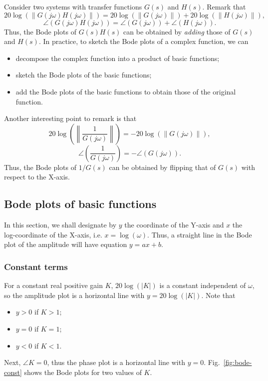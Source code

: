 \documentclass[a4paper,11pt]{report}
\theoremstyle{definition}
\begin{document}
Consider two systems with transfer functions $G(s)$ and $H(s)$. Remark
that
\[
20\log(\|G(j\omega)H(j\omega)\|) = 20\log(\|G(j\omega)\|) + 20 \log(\|H(j\omega)\|),
\]
\[
\angle(G(j\omega)H(j\omega)) = \angle(G(j\omega)) + \angle(H(j\omega)).
\]
Thus, the Bode plots of $G(s)H(s)$ can be obtained by \emph{adding}
those of $G(s)$ and $H(s)$. In practice, to sketch the Bode plots of a
complex function, we can
\begin{itemize}
\item decompose the complex function into a product of basic functions;
\item sketch the Bode plots of the basic functions;
\item add the Bode plots of the basic functions to obtain those of the
  original function.
\end{itemize}

Another interesting point to remark is that
\[
20\log\left(\left\|\frac{1}{G(j\omega)}\right\|\right) = -20\log(\|G(j\omega)\|),
\]
\[
\angle\left(\frac{1}{G(j\omega)}\right) = -\angle(G(j\omega)).
\]
Thus, the Bode plots of $1/G(s)$ can be obtained by flipping that of
$G(s)$ with respect to the X-axis.

\subsection{Bode plots of basic functions}

In this section, we shall designate by $y$ the coordinate of the
Y-axis and $x$ the log-coordinate of the X-axis,
i.e. $x=\log(\omega)$. Thus, a straight line in the Bode plot of the
amplitude will have equation $y=ax+b$.

\subsubsection{Constant terms}

For a constant real positive gain $K$, $20\log(|K|)$ is a constant
independent of $\omega$, so the amplitude plot is a horizontal line
with $y=20\log(|K|)$. Note that
\begin{itemize}
\item $y>0$ if $K>1$;
\item $y=0$ if $K=1$;
\item $y<0$ if $K<1$.
\end{itemize}

Next, $\angle K=0$, thus the phase plot is a horizontal line with
$y=0$. Fig.~\ref{fig:bode-const} shows the Bode plots for two values
of $K$.
\end{document}
